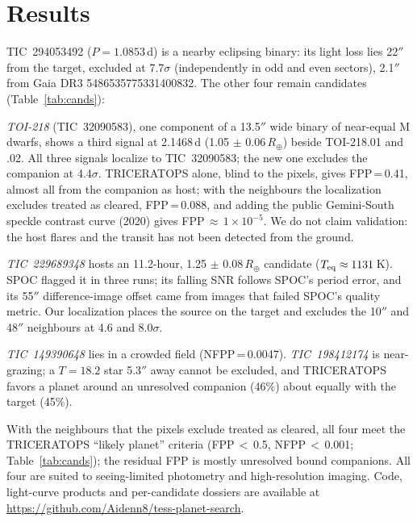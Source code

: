\documentclass[RNAAS]{aastex631}
\begin{document}
\section{Results}
TIC~294053492 ($P=1.0853$\,d) is a nearby eclipsing binary: its light loss lies
22$''$ from the target, excluded at 7.7$\sigma$ (independently in odd
and even sectors), 2.1$''$ from Gaia DR3 5486535775331400832. The other four remain candidates
(Table~\ref{tab:cands}):

\textit{TOI-218} (TIC~32090583), one component of a 13.5$''$ wide binary of near-equal M dwarfs, shows a third
signal at 2.1468\,d (1.05 $\pm$ 0.06\,$R_\oplus$) beside TOI-218.01 and .02. All three signals
localize to TIC~32090583; the new one excludes the companion at 4.4$\sigma$.
TRICERATOPS alone, blind to the pixels, gives FPP\,=\,0.41, almost all from the companion as host;
with the neighbours the localization excludes treated as cleared, FPP\,=\,0.088, and adding the public
Gemini-South speckle contrast curve (2020) gives FPP\,$\approx$\,$1\times10^{-5}$. We do not claim
validation: the host flares and the transit has not been detected from the ground.

\textit{TIC~229689348} hosts an 11.2-hour, 1.25 $\pm$ 0.08\,$R_\oplus$ candidate ($T_{\rm eq}\approx
1131$\,K). SPOC flagged it in three runs; its falling SNR follows SPOC's period error, and its
55$''$ difference-image offset came from images that failed SPOC's quality metric. Our localization places
the source on the target and excludes the 10$''$ and 48$''$ neighbours at 4.6 and
8.0$\sigma$.

\textit{TIC~149390648} lies in a crowded field (NFPP\,=\,0.0047).
\textit{TIC~198412174} is near-grazing; a $T=18.2$ star 5.3$''$ away cannot be excluded, and TRICERATOPS
favors a planet around an unresolved companion (46\%) about equally with the target
(45\%).

With the neighbours that the pixels exclude treated as cleared, all four meet the TRICERATOPS ``likely planet''
criteria (FPP\,$<$\,0.5, NFPP\,$<$\,0.001; Table~\ref{tab:cands}); the residual FPP is mostly unresolved bound
companions. All four are suited to seeing-limited photometry and high-resolution imaging. Code, light-curve products
and per-candidate dossiers are available at \url{https://github.com/Aidenn8/tess-planet-search}.
\end{document}
